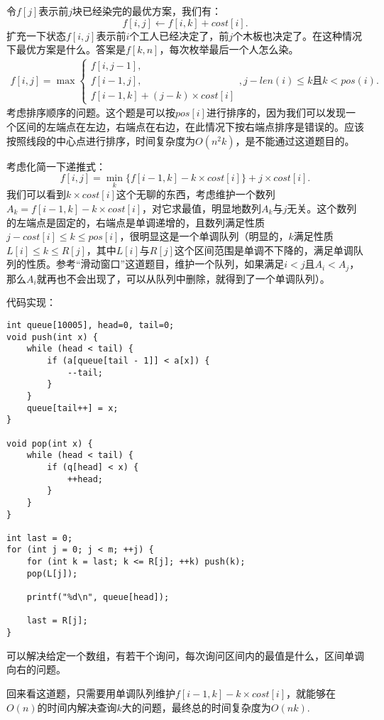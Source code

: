 令$f[j]$表示前$j$块已经染完的最优方案，我们有：
\begin{equation*}
    f[i,j]\leftarrow f[i,k]+cost[i].
\end{equation*}
扩充一下状态$f[i,j]$表示前$i$个工人已经决定了，前$j$个木板也决定了。在这种情况下最优方案是什么。答案是$f[k,n]$，每次枚举最后一个人怎么染。
\begin{equation*}
    \begin{aligned}
        f[i,j]=\max
        \begin{cases}
            f[i,j-1],\\
            f[i-1,j],\\
            f[i-1,k]+(j-k)\times cost[i]
        \end{cases}
        ,j-len(i)\le k且k<pos(i).
    \end{aligned}
\end{equation*}
考虑排序顺序的问题。这个题是可以按$pos[i]$进行排序的，因为我们可以发现一个区间的左端点在左边，右端点在右边，在此情况下按右端点排序是错误的。应该按照线段的中心点进行排序，时间复杂度为$O(n^2k)$，是不能通过这道题目的。

考虑化简一下递推式：
\begin{equation*}
    f[i,j]=\min\limits_k\{f[i-1,k]-k\times cost[i]\}+j\times cost[i].
\end{equation*}
我们可以看到$k\times cost[i]$这个无聊的东西，考虑维护一个数列$A_k=f[i-1,k]-k\times cost[i]$，对它求最值，明显地数列$A_k$与$j$无关。这个数列的左端点是固定的，右端点是单调递增的，且数列满足性质$j-cost[i]\le k\le pos[i]$，很明显这是一个单调队列（明显的，$k$满足性质$L[i]\le k\le R[j]$，其中$L[i]$与$R[j]$这个区间范围是单调不下降的，满足单调队列的性质。参考“滑动窗口”这道题目，维护一个队列，如果满足$i<j$且$A_i<A_j$，那么$A_i$就再也不会出现了，可以从队列中删除，就得到了一个单调队列）。

代码实现：
\begin{verbatim}
int queue[10005], head=0, tail=0;
void push(int x) {
    while (head < tail) {
        if (a[queue[tail - 1]] < a[x]) {
            --tail;
        }
    }
    queue[tail++] = x;
}

void pop(int x) {
    while (head < tail) {
        if (q[head] < x) {
            ++head;
        }
    }
}

int last = 0;
for (int j = 0; j < m; ++j) {
    for (int k = last; k <= R[j]; ++k) push(k);
    pop(L[j]);

    printf("%d\n", queue[head]);

    last = R[j];
}
\end{verbatim}

可以解决给定一个数组，有若干个询问，每次询问区间内的最值是什么，区间单调向右的问题。

回来看这道题，只需要用单调队列维护$f[i-1,k]-k\times cost[i]$，就能够在$O(n)$的时间内解决查询$k$大的问题，最终总的时间复杂度为$O(nk)$.

